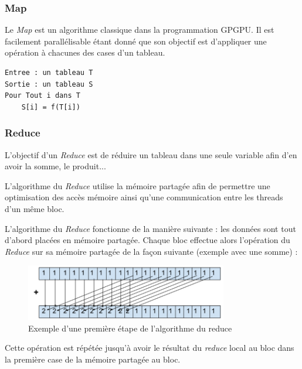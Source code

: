 \documentclass{report}
\begin{document}
\subsubsection{Map}

Le \textit{Map} est un algorithme classique dans la programmation GPGPU. Il est facilement parallélisable étant donné que son objectif est d'appliquer une opération à chacunes des cases d'un tableau.\newline

\begin{lstlisting} 
Entree : un tableau T
Sortie : un tableau S
Pour Tout i dans T
    S[i] = f(T[i])
\end{lstlisting}

\subsubsection{Reduce}

L'objectif d'un \textit{Reduce} est de réduire un tableau dans une seule variable afin d'en avoir la somme, le produit...\newline

L'algorithme du \textit{Reduce} utilise la mémoire partagée afin de permettre une optimisation des accès mémoire ainsi qu'une communication entre les threads d'un même bloc.\newline

L'algorithme du \textit{Reduce} fonctionne de la manière suivante : les données sont tout d'abord placées en mémoire partagée. Chaque bloc effectue alors l'opération du \textit{Reduce} sur sa mémoire partagée de la façon suivante (exemple avec une somme) : \newline
\begin{center}
\end{center}
\begin{figure}[!h]
\begin{center}
\includegraphics[width=250pt]{images_finales/schema_reduce.png}
\end{center}
\caption{Exemple d'une première étape de l'algorithme du reduce}
\label{test9}
\end{figure}

Cette opération est répétée jusqu'à avoir le résultat du \textit{reduce} local au bloc dans la première case de la mémoire partagée au bloc.\newline
\end{document}
